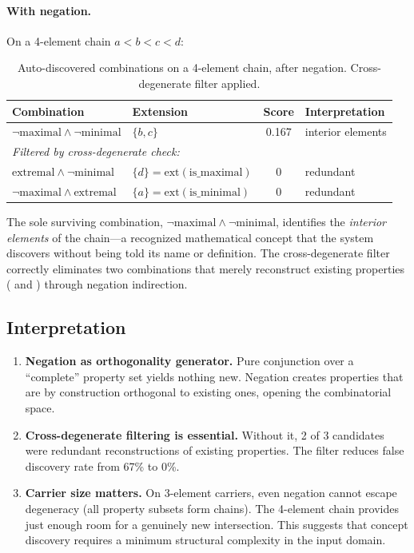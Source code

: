 \paragraph{With negation.} On a 4-element chain $a < b < c < d$:

\begin{table}[h]
\centering
\caption{Auto-discovered combinations on a 4-element chain, after negation. Cross-degenerate filter applied.}
\label{tab:combos}
\begin{tabular}{llcl}
\toprule
Combination & Extension & Score & Interpretation \\
\midrule
$\lnot\text{maximal} \wedge \lnot\text{minimal}$ & $\{b, c\}$ & 0.167 & interior elements \\
\midrule
\multicolumn{4}{l}{\emph{Filtered by cross-degenerate check:}} \\
$\text{extremal} \wedge \lnot\text{minimal}$ & $\{d\} = \mathrm{ext}(\text{is\_maximal})$ & 0 & redundant \\
$\lnot\text{maximal} \wedge \text{extremal}$ & $\{a\} = \mathrm{ext}(\text{is\_minimal})$ & 0 & redundant \\
\bottomrule
\end{tabular}
\end{table}

The sole surviving combination, $\lnot\text{maximal} \wedge \lnot\text{minimal}$, identifies the \emph{interior elements} of the chain---a recognized mathematical concept that the system discovers without being told its name or definition. The cross-degenerate filter correctly eliminates two combinations that merely reconstruct existing properties ( and ) through negation indirection.

\subsection{Interpretation}

\begin{enumerate}
\item \textbf{Negation as orthogonality generator.} Pure conjunction over a ``complete'' property set yields nothing new. Negation creates properties that are by construction orthogonal to existing ones, opening the combinatorial space.

\item \textbf{Cross-degenerate filtering is essential.} Without it, 2 of 3 candidates were redundant reconstructions of existing properties. The filter reduces false discovery rate from 67\% to 0\%.

\item \textbf{Carrier size matters.} On 3-element carriers, even negation cannot escape degeneracy (all property subsets form chains). The 4-element chain provides just enough room for a genuinely new intersection. This suggests that concept discovery requires a minimum structural complexity in the input domain.
\end{enumerate}

